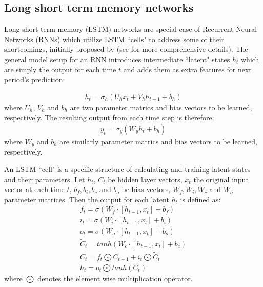 \documentclass{article}
\begin{document}
\FloatBarrier
\subsection{Long short term memory networks}
Long short term memory (LSTM) networks are special case of Recurrent Neural Networks (RNNs) which utilize LSTM ``cells" to address some of their shortcomings, initially proposed by \cite{hochreiter_long_1997} (see for more comprehensive details). The general model setup for an RNN introduces intermediate ``latent" states $h_t$ which are simply the output for each time $t$ and adds them as extra features for next period's prediction:

\begin{align}
	h_t = \sigma_h (U_h x_t + V_h h_{t-1} + b_h)
\end{align}
where $U_h$, $V_h$ and $b_h$ are two parameter matrics and bias vectors to be learned, respectively. 
The resulting output from each time step is therefore:
\begin{align}
	y_t = \sigma_y (W_y h_t + b_h)
\end{align}
where $W_y$ and $b_h$ are similarly parameter matrics and bias vectors to be learned, respectively.

An LSTM ``cell" is a specific structure of calculating and training latent states and their parameters. Let $h_t$, $C_t$ be hidden layer vectors, $x_t$ the original input vector at each time $t$, $b_f, b_i, b_c$ and $b_o$ be bias vectors, $W_f, W_i, W_c$ and $W_o$ parameter matrices. Then the output for each latent $h_t$ is defined as:
\begin{align}
	f_t = \sigma(W_f \cdot [h_{t-1}, x_t] + b_f) \\
	i_t = \sigma(W_i \cdot [h_{t-1}, x_t] + b_i) \\
	o_t = \sigma(W_o \cdot [h_{t-1}, x_t] + b_o) \\
	\tilde{C}_t = tanh(W_c \cdot [h_{t-1}, x_t] + b_c) \\
	C_t = f_t \bigodot C_{t-1} + i_t \bigodot \tilde{C}_t \\
	h_t = o_t \bigodot tanh(C_t)
\end{align}
where $\bigodot$ denotes the element wise multiplication operator.
\end{document}

